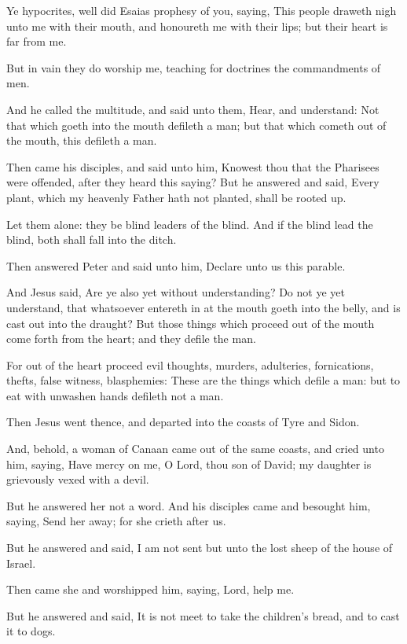 \Verse Ye hypocrites, well did Esaias prophesy of you, saying, \Verse This people draweth nigh unto me with their mouth, and honoureth me with their lips; but their heart is far from me.

\Verse But in vain they do worship me, teaching for doctrines the commandments of men.

\Verse And he called the multitude, and said unto them, Hear, and understand: \Verse Not that which goeth into the mouth defileth a man; but that which cometh out of the mouth, this defileth a man.

\Verse Then came his disciples, and said unto him, Knowest thou that the Pharisees were offended, after they heard this saying?  \Verse But he answered and said, Every plant, which my heavenly Father hath not planted, shall be rooted up.

\Verse Let them alone: they be blind leaders of the blind. And if the blind lead the blind, both shall fall into the ditch.

\Verse Then answered Peter and said unto him, Declare unto us this parable.

\Verse And Jesus said, Are ye also yet without understanding?  \Verse Do not ye yet understand, that whatsoever entereth in at the mouth goeth into the belly, and is cast out into the draught?  \Verse But those things which proceed out of the mouth come forth from the heart; and they defile the man.

\Verse For out of the heart proceed evil thoughts, murders, adulteries, fornications, thefts, false witness, blasphemies: \Verse These are the things which defile a man: but to eat with unwashen hands defileth not a man.

\Verse Then Jesus went thence, and departed into the coasts of Tyre and Sidon.

\Verse And, behold, a woman of Canaan came out of the same coasts, and cried unto him, saying, Have mercy on me, O Lord, thou son of David; my daughter is grievously vexed with a devil.

\Verse But he answered her not a word. And his disciples came and besought him, saying, Send her away; for she crieth after us.

\Verse But he answered and said, I am not sent but unto the lost sheep of the house of Israel.

\Verse Then came she and worshipped him, saying, Lord, help me.

\Verse But he answered and said, It is not meet to take the children's bread, and to cast it to dogs.

